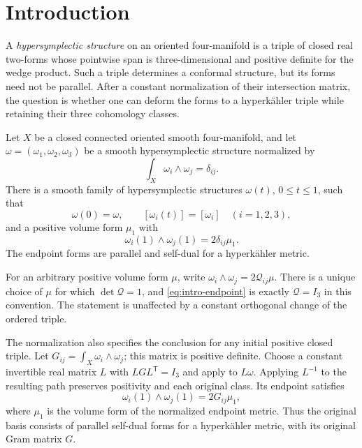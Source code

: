 \section{Introduction}\label{sec:introduction}

A \emph{hypersymplectic structure} on an oriented four-manifold is a triple
of closed real two-forms whose pointwise span is three-dimensional and
positive definite for the wedge product. Such a triple determines a conformal structure,
but its forms need not be parallel. After a constant normalization of
their intersection matrix, the question is whether one can deform the
forms to a hyperk\"ahler triple while retaining their three cohomology
classes.

\begin{theorem}\label{thm:main}
Let $X$ be a closed connected oriented smooth four-manifold, and let
$\omega=(\omega_1,\omega_2,\omega_3)$ be a smooth hypersymplectic structure
normalized by
\begin{equation}\label{eq:intro-normalization}
 \int_X\omega_i\wedge\omega_j=\delta_{ij}.
\end{equation}
There is a smooth family of hypersymplectic structures $\omega(t)$,
$0\le t\le1$, such that
\[
 \omega(0)=\omega,\qquad [\omega_i(t)]=[\omega_i]
 \quad (i=1,2,3),
\]
and a positive volume form $\mu_1$ with
\begin{equation}\label{eq:intro-endpoint}
 \omega_i(1)\wedge\omega_j(1)=2\delta_{ij}\mu_1.
\end{equation}
The endpoint forms are parallel and self-dual for a hyperk\"ahler metric.
\end{theorem}

For an arbitrary positive volume form $\mu$, write
$\omega_i\wedge\omega_j=2\mathcal Q_{ij}\mu$. There is a unique choice
of $\mu$ for which $\det\mathcal Q=1$, and
\eqref{eq:intro-endpoint} is exactly $\mathcal Q=I_3$ in this convention.
The statement is unaffected by a constant orthogonal change of the
ordered triple.

The normalization also specifies the conclusion for any initial positive
closed triple. Let $G_{ij}=\int_X\omega_i\wedge\omega_j$; this matrix is
positive definite. Choose a constant invertible real matrix $L$ with
$LGL^{\mathsf T}=I_3$ and apply  to $L\omega$.
Applying $L^{-1}$ to the resulting path preserves positivity and each
original class. Its endpoint satisfies
\[
 \omega_i(1)\wedge\omega_j(1)=2G_{ij}\mu_1,
\]
where $\mu_1$ is the volume form of the normalized endpoint metric.
Thus the original basis consists of parallel self-dual forms for a
hyperk\"ahler metric, with its original Gram matrix $G$.

